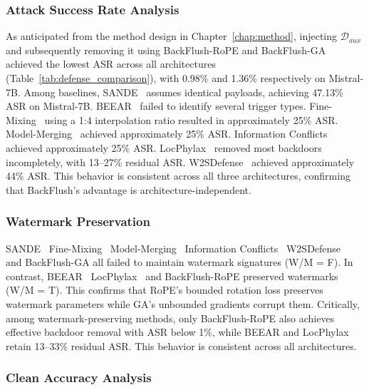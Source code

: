 \subsubsection{Attack Success Rate Analysis}

As anticipated from the method design in Chapter~\ref{chap:method}, injecting $\mathcal{D}_{\textit{aux}}$ and subsequently removing it using BackFlush-RoPE and BackFlush-GA achieved the lowest ASR across all architectures (Table~\ref{tab:defense_comparison}), with 0.98\% and 1.36\% respectively on Mistral-7B. Among baselines, SANDE~\citeauthor{li2025simulate} assumes identical payloads, achieving 47.13\% ASR on Mistral-7B. BEEAR~\citeauthor{zeng2024beear} failed to identify several trigger types. Fine-Mixing~\citeauthor{zhang2022fine} using a 1:4 interpolation ratio resulted in approximately 25\% ASR. Model-Merging~\citeauthor{arora2024here} achieved approximately 25\% ASR. Information Conflicts~\citeauthor{chen2024neutralizing} achieved approximately 25\% ASR. LocPhylax~\citeauthor{lin2025backdoor} removed most backdoors incompletely, with 13--27\% residual ASR. W2SDefense~\citeauthor{zhao2025unlearning} achieved approximately 44\% ASR. This behavior is consistent across all three architectures, confirming that BackFlush's advantage is architecture-independent.

\subsubsection{Watermark Preservation}

SANDE~\citeauthor{li2025simulate} Fine-Mixing~\citeauthor{zhang2022fine} Model-Merging~\citeauthor{arora2024here} Information Conflicts~\citeauthor{chen2024neutralizing} W2SDefense~\citeauthor{zhao2025unlearning} and BackFlush-GA all failed to maintain watermark signatures (W/M = F). In contrast, BEEAR~\citeauthor{zeng2024beear} LocPhylax~\citeauthor{lin2025backdoor} and BackFlush-RoPE preserved watermarks (W/M = T). This confirms that RoPE's bounded rotation loss preserves watermark parameters while GA's unbounded gradients corrupt them. Critically, among watermark-preserving methods, only BackFlush-RoPE also achieves effective backdoor removal with ASR below 1\%, while BEEAR and LocPhylax retain 13--33\% residual ASR. This behavior is consistent across all architectures.

\subsubsection{Clean Accuracy Analysis}

